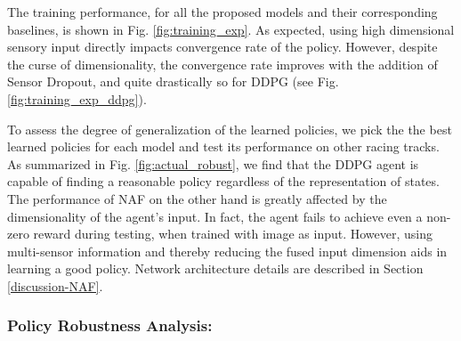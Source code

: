 \documentclass[../thesis.tex]{subfiles}
\begin{document}
The training performance, for all the proposed models and their corresponding baselines, is shown in Fig. \ref{fig:training_exp}. As expected, using high dimensional sensory input directly impacts convergence rate of the policy. However, despite the curse of dimensionality, the convergence rate improves with the addition of Sensor Dropout, and quite drastically so for DDPG (see Fig. \ref{fig:training_exp_ddpg}).

To assess the degree of generalization of the learned policies, we pick the the best learned policies for each model and test its performance on other racing tracks. As summarized in Fig. \ref{fig:actual_robust}, we find that the DDPG agent is capable of finding a reasonable policy regardless of the representation of states. The performance of NAF on the other hand is greatly affected by the dimensionality of the agent's input. In fact, the agent fails to achieve even a non-zero reward during testing, when trained with image as input. However, using multi-sensor information and thereby reducing the fused input dimension aids in learning a good policy. Network architecture details are described in Section \ref{discussion-NAF}.



\subsubsection{Policy Robustness Analysis:} 
\end{document}
